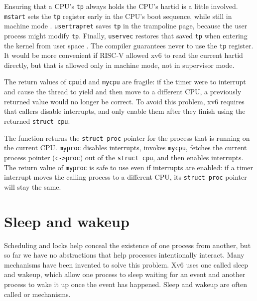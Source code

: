 Ensuring that a CPU's \lstinline{tp} always holds the CPU's
hartid is a little involved. \lstinline{mstart} sets the \lstinline{tp}
register early in the CPU's boot sequence, while still in machine mode
.
\lstinline{usertrapret} saves \lstinline{tp} in the trampoline
page, because the user process might modify \lstinline{tp}.
Finally, \lstinline{uservec} restores that saved \lstinline{tp}
when entering the kernel from user space
.
The compiler guarantees never to use the \lstinline{tp}
register.
It would be more convenient if RISC-V allowed xv6 to read the
current hartid directly, but that is allowed only in
machine mode, not in supervisor mode.

The return values of
\lstinline{cpuid}
and
\lstinline{mycpu}
are fragile: if the timer were to interrupt and cause
the thread to yield and then move to a different CPU,
a previously returned value would no longer be correct.
To avoid this problem, xv6 requires that callers 
disable interrupts, and only enable
them after they finish using the returned
\lstinline{struct cpu}.

The function
returns the
\lstinline{struct proc}
pointer
for the process that is running on the current CPU.
\lstinline{myproc}
disables interrupts, invokes
\lstinline{mycpu},
fetches the current process pointer
(\lstinline{c->proc})
out of the
\lstinline{struct cpu},
and then enables interrupts.
The return value of
\lstinline{myproc}
is safe to use even if interrupts are enabled:
if a timer interrupt moves the calling process to a
different CPU, its
\lstinline{struct proc}
pointer will stay the same.
\section{Sleep and wakeup}
\label{sec:sleep}

Scheduling and locks help conceal the existence of one process
from another,
but so far we have no abstractions that help
processes intentionally interact.
Many mechanisms have been invented to solve this problem.
Xv6 uses one called sleep and wakeup, which allow one process to
sleep waiting for an event and another process to wake it up
once the event has happened.
Sleep and wakeup are often called 
or 
mechanisms.

